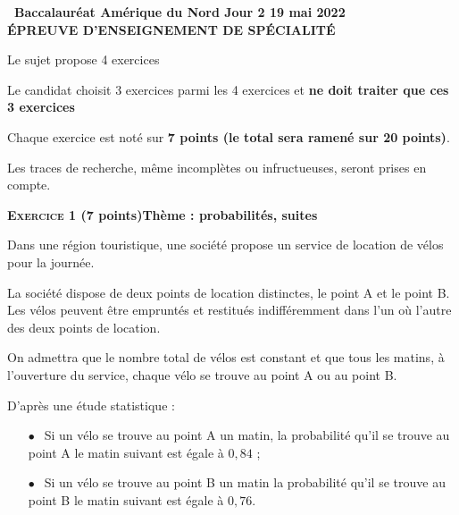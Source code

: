 \documentclass[10pt]{article}
\begin{document}
\setlength\parindent{0mm}
\pagestyle{fancy}
\thispagestyle{empty}

\begin{center}{\Large\textbf{\decofourleft~Baccalauréat Amérique du Nord Jour 2 19 mai 2022~\decofourright\\[6pt] ÉPREUVE D'ENSEIGNEMENT DE SPÉCIALITÉ}}
\end{center}

\vspace{0,25cm}

Le sujet propose 4 exercices

Le candidat choisit 3 exercices parmi les 4 exercices et \textbf{ne doit traiter que ces 3 exercices}

Chaque exercice est noté sur \textbf{7 points (le total sera ramené sur 20 points)}.

Les traces de recherche, même incomplètes ou infructueuses, seront prises en compte.

\bigskip

\textbf{\textsc{Exercice 1} \quad (7 points)\hfill Thème : probabilités, suites}

\medskip

Dans une région touristique, une société propose un service de location de vélos pour la journée.

\smallskip

La société dispose de deux points de location distinctes, le point A et le point B. Les vélos peuvent être empruntés et restitués indifféremment dans l'un où l'autre des deux points de location.

\smallskip

On admettra que le nombre total de vélos est constant et que tous les matins, à l'ouverture du service, chaque vélo se trouve au point A ou au point B.

\smallskip

D'après une étude statistique :

\smallskip

\setlength\parindent{1cm}
\begin{itemize}
\item[$\bullet~~$] Si un vélo se trouve au point A un matin, la probabilité qu'il se trouve au point A le matin suivant est égale à $0,84$ ;
\item[$\bullet~~$] Si un vélo se trouve au point B un matin la probabilité qu'il se trouve au point B le matin suivant est égale à $0,76$.
\end{itemize}
\setlength\parindent{0cm}
\end{document}
